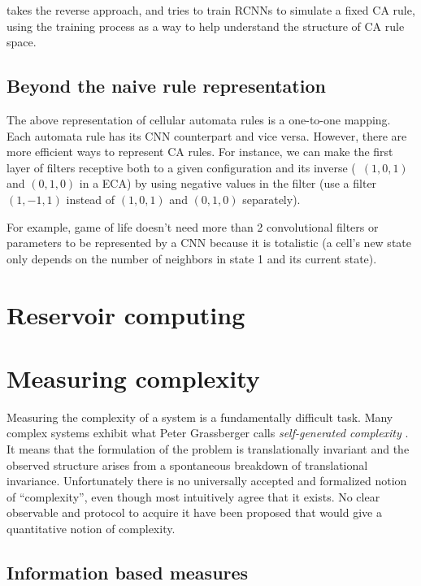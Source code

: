 \textcite{gilpinCellularAutomataConvolutional2018} takes the reverse approach, and
tries to train RCNNs to simulate a fixed CA rule, using the training process as
a way to help understand the structure of CA rule space.

\subsection{Beyond the naive rule representation}

The above representation of cellular automata rules is a one-to-one mapping.
Each automata rule has its CNN counterpart and vice versa. However, there are
more efficient ways to represent CA rules. For instance, we can make the first
layer of filters receptive both to a given configuration and its inverse
(\eg~$(1, 0, 1)$ and $(0, 1, 0)$ in a ECA) by using negative values in the
filter (use a filter $(1, -1, 1)$ instead of $(1, 0, 1)$ and $(0, 1, 0)$
separately).

For example, game of life doesn't need more than 2 convolutional filters or
parameters to be represented by a CNN because it is totalistic (a cell's new
state only depends on the number of neighbors in state 1 and its current state).


\section{Reservoir computing}



\section{Measuring complexity}

Measuring the complexity of a system is a fundamentally difficult task. Many
complex systems exhibit what Peter Grassberger calls \emph{self-generated
  complexity} \parencite{grassbergerQuantitativeTheorySelfgenerated1986}. It
means that the formulation of the problem is translationally invariant and the
observed structure arises from a spontaneous breakdown of translational
invariance. Unfortunately there is no universally accepted and formalized notion
of ``complexity'', even though most intuitively agree that it exists. No clear
observable and protocol to acquire it have been proposed that would give a
quantitative notion of complexity.

\subsection{Information based measures}


